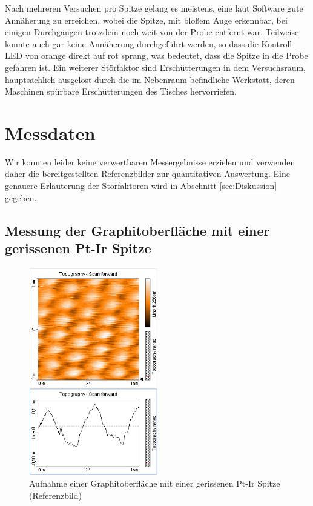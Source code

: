 \documentclass[10pt, a4paper]{article}
\begin{document}
Nach mehreren Versuchen pro Spitze gelang es meistens, eine laut Software gute An\-nä\-he\-rung zu erreichen, wobei die Spitze, mit bloßem Auge erkennbar, bei einigen Durchgängen trotzdem noch weit von der Probe entfernt war.
Teilweise konnte auch gar keine Annäherung durchgeführt werden, so dass die Kontroll-LED von orange direkt auf rot sprang, was bedeutet, dass die Spitze in die Probe gefahren ist.
Ein weiterer Störfaktor sind Erschütterungen in dem Versuchsraum, hauptsächlich ausgelöst durch die im Nebenraum befindliche Werkstatt, deren Maschinen spürbare Erschütterungen des Tisches hervorriefen.

\section{Messdaten}
Wir konnten leider keine verwertbaren Messergebnisse erzielen und verwenden daher die bereitgestellten Referenzbilder zur quantitativen Auswertung.
Eine genauere Erläuterung der Störfaktoren wird in Abschnitt \ref{sec:Diskussion} gegeben.

\subsection{Messung der Graphitoberfläche mit einer gerissenen Pt-Ir Spitze}
\begin{figure}[!h]
\centering
\includegraphics[width=0.5\textwidth]{./grafiken/originale/ref_graphit_pt_ir_1nm.png}
\caption{Aufnahme einer Graphitoberfläche mit einer gerissenen Pt-Ir Spitze (Referenzbild)}
\label{fig:ref_ptir}
\end{figure}
\end{document}
